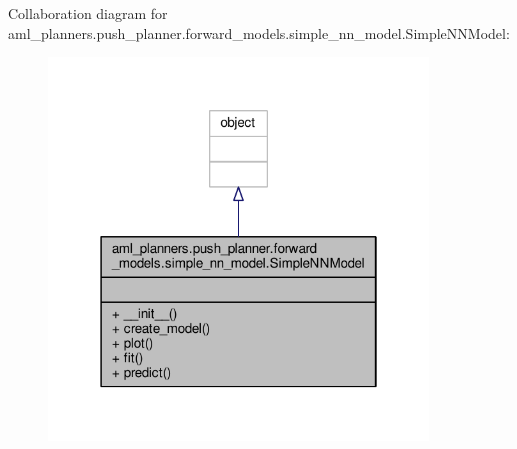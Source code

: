 Collaboration diagram for aml\-\_\-planners.\-push\-\_\-planner.\-forward\-\_\-models.\-simple\-\_\-nn\-\_\-model.\-Simple\-N\-N\-Model\-:\nopagebreak
\begin{figure}[H]
\begin{center}
\leavevmode
\includegraphics[width=286pt]{classaml__planners_1_1push__planner_1_1forward__models_1_1simple__nn__model_1_1_simple_n_n_model__coll__graph}
\end{center}
\end{figure}
